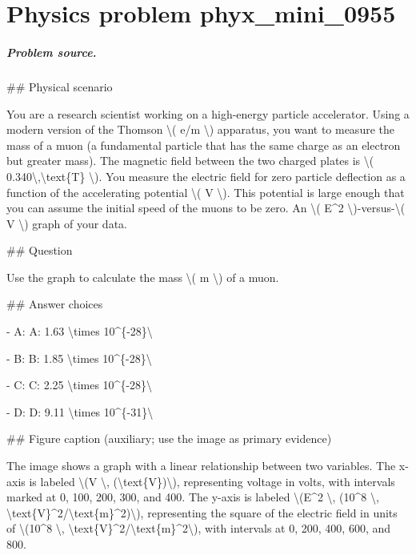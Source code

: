 
\chapter{Physics problem phyx\_mini\_0955}
\label{ch:PhyXMiniProblems_problem_phyx_mini_0955}

\paragraph{Problem source.}
\#\# Physical scenario

You are a research scientist working on a high-energy particle accelerator. Using a modern version of the Thomson \textbackslash{}( e/m \textbackslash{}) apparatus, you want to measure the mass of a muon (a fundamental particle that has the same charge as an electron but greater mass). The magnetic field between the two charged plates is \textbackslash{}( 0.340\textbackslash{},\textbackslash{}text\{T\} \textbackslash{}). You measure the electric field for zero particle deflection as a function of the accelerating potential \textbackslash{}( V \textbackslash{}). This potential is large enough that you can assume the initial speed of the muons to be zero. An \textbackslash{}( E\textasciicircum{}2 \textbackslash{})-versus-\textbackslash{}( V \textbackslash{}) graph of your data.

\#\# Question

Use the graph to calculate the mass \textbackslash{}( m \textbackslash{}) of a muon.

\#\# Answer choices

- A: A: 1.63 \textbackslash{}times 10\textasciicircum{}\{-28\}\textbackslash{}

- B: B: 1.85 \textbackslash{}times 10\textasciicircum{}\{-28\}\textbackslash{}

- C: C: 2.25 \textbackslash{}times 10\textasciicircum{}\{-28\}\textbackslash{}

- D: D: 9.11 \textbackslash{}times 10\textasciicircum{}\{-31\}\textbackslash{}

\#\# Figure caption (auxiliary; use the image as primary evidence)

The image shows a graph with a linear relationship between two variables. The x-axis is labeled \textbackslash{}(V \textbackslash{}, (\textbackslash{}text\{V\})\textbackslash{}), representing voltage in volts, with intervals marked at 0, 100, 200, 300, and 400. The y-axis is labeled \textbackslash{}(E\textasciicircum{}2 \textbackslash{}, (10\textasciicircum{}8 \textbackslash{}, \textbackslash{}text\{V\}\textasciicircum{}2/\textbackslash{}text\{m\}\textasciicircum{}2)\textbackslash{}), representing the square of the electric field in units of \textbackslash{}(10\textasciicircum{}8 \textbackslash{}, \textbackslash{}text\{V\}\textasciicircum{}2/\textbackslash{}text\{m\}\textasciicircum{}2\textbackslash{}), with intervals at 0, 200, 400, 600, and 800.

